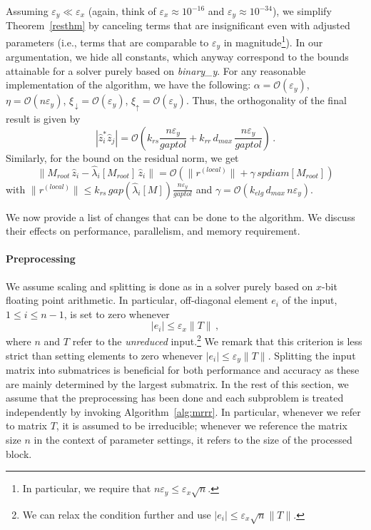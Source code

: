 \documentclass[final]{siamltex}
\newcommand\norm[1]{\lVert#1\rVert}
\newcommand\order[1]{\mathcal{O}(#1)}
\newcommand{\binaryy}{{\it binary\_\hspace*{0pt}y}}
\begin{document}
Assuming $\varepsilon_y \ll \varepsilon_x$ (again, think of $\varepsilon_x
\approx 10^{-16}$ and $\varepsilon_y \approx 10^{-34}$), we simplify
Theorem~\ref{resthm} by canceling terms that are insignificant  
even with adjusted parameters (i.e., terms that are comparable to
$\varepsilon_y$ in magnitude\footnote{In particular, we require that $n \varepsilon_y \leq
  \varepsilon_x \sqrt{n}$.}). In our argumentation, we hide all constants,
which anyway correspond to the bounds attainable for a solver purely based
on \binaryy.  For any reasonable implementation of the algorithm, we have the following:
$\alpha = \order{\varepsilon_y}$, $\eta = \order{n \varepsilon_y}$,
$\xi_{\,\downarrow} = \order{\varepsilon_y}$, $\xi_{\uparrow} = \order{\varepsilon_y}$. 
Thus, the orthogonality of the final result is given by 
\begin{equation}
|\hat{z}_i^* \hat{z}_j| = \mathcal{O}\left( k_{rs} \frac{n
    \varepsilon_y}{gaptol} + k_{rr} \, d_{max}\, \frac{n \varepsilon_y}{gaptol} \right) \,.
\label{simpleorthobound}
\end{equation}
Similarly, for the bound on the residual norm, we get 
\begin{equation}
\norm{M_{root}\, \hat{z}_i - \hat{\lambda}_i[M_{root}]  \, \hat{z}_i} =
\mathcal{O}\left(\norm{r^{(local)}} + \gamma \, spdiam[M_{root}]\right)
\label{simpleresbound}
\end{equation}
with $\norm{r^{(local)}} \leq k_{rs} \, gap\left(\hat{\lambda}_i[M]\right) \frac{n
\varepsilon_y}{gaptol}$
 and $\gamma = \order{k_{elg} \, d_{max} \, n \varepsilon_y}$.

We now provide a list of changes that can be done to the algorithm. 
We discuss their effects on performance, parallelism, and memory
requirement.  

\paragraph{Preprocessing}
We assume scaling and splitting is done as in a solver purely based on $x$-bit
floating point arithmetic. In particular, off-diagonal
element $e_i$ of the input, $1 \leq i \leq n-1$, is set to zero whenever
\begin{equation*} 
|e_i| \leq \varepsilon_x \norm{T} \,,
\end{equation*}  
where $n$ and $T$ refer to the {\it unreduced} input.\footnote{We can
  relax the condition further and use
  $|e_i| \leq \varepsilon_x \sqrt{n} \norm{T}$.} 
We remark that this
criterion is less strict than setting elements to zero whenever $|e_i| \leq
\varepsilon_y \norm{T}$. Splitting the input matrix into submatrices is
beneficial for both performance and accuracy as these are mainly determined
by the largest submatrix.
In the rest of this
section, we assume that the preprocessing has been done and each subproblem
is treated independently by invoking Algorithm~\ref{alg:mrrr}. In particular, whenever
we refer to matrix $T$, it is assumed to be irreducible; whenever we
reference the matrix size $n$ in the context of parameter settings, it refers
to the size of the processed block. 
\end{document}
